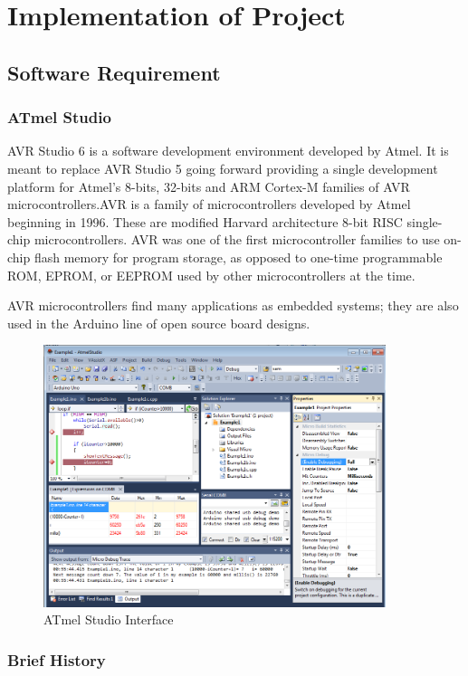 \documentclass[twoside,a4paper,16pt]{book}
\begin{document}
{{			\chapter{\bf Implementation of Project }
			\section{Software Requirement }
			\subsection{ATmel Studio}
			AVR Studio 6 is a software development environment developed by Atmel. It is meant to replace AVR Studio 5 going forward providing a single development platform for Atmel's 8-bits, 32-bits and ARM Cortex-M families of AVR microcontrollers.AVR is a family of microcontrollers developed by Atmel beginning in 1996. These are modified Harvard architecture 8-bit RISC single-chip microcontrollers. AVR was one of the first microcontroller families to use on-chip flash memory for program storage, as opposed to one-time programmable ROM, EPROM, or EEPROM used by other microcontrollers at the time.
			
			AVR microcontrollers find many applications as embedded systems; they are also used in the Arduino line of open source board designs.
			
			\begin{figure}
				\begin{center}
					\includegraphics[width=10.0cm]{cc.png}
					\caption{ATmel Studio Interface}
				\end{center}
			\end{figure}
			\subsection*{Brief History}
			
}}
\end{document}
